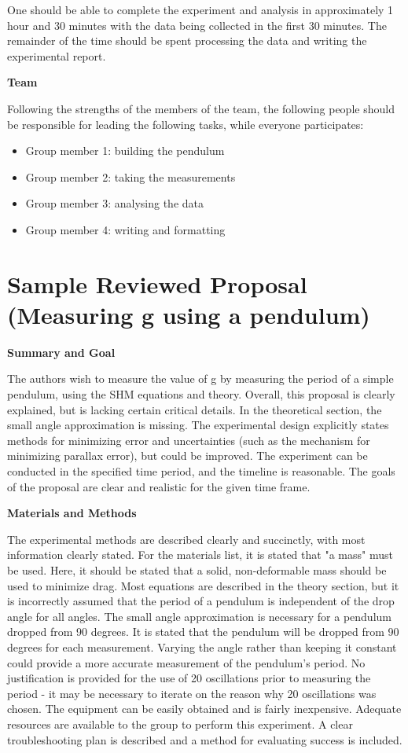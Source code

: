One should be able to complete the experiment and analysis in approximately 1 hour and 30 minutes with the data being collected in the first 30 minutes. The remainder of the time should be spent processing the data and writing the experimental report. 

\textbf{Team}

Following the strengths of the members of the team, the following people should be responsible for leading the following tasks, while everyone participates:

\begin{itemize}
\item Group member 1: building the pendulum
\item Group member 2: taking the measurements
\item Group member 3: analysing the data
\item Group member 4: writing and formatting
\end{itemize}

 \vspace{0.25cm}
\section{Sample Reviewed Proposal (Measuring g using a pendulum)}
 \vspace{0.25cm}
\textbf{Summary and Goal}

The authors wish to measure the value of g by measuring the period of a simple pendulum, using the SHM equations and theory. Overall, this proposal is clearly explained, but is lacking certain critical details. In the theoretical section, the small angle approximation is missing. The experimental design explicitly states methods for minimizing error and uncertainties (such as the mechanism for minimizing parallax error), but could be improved. The experiment can be conducted in the specified time period, and the timeline is reasonable. The goals of the proposal are clear and realistic for the given time frame. 

\textbf{Materials and Methods}

The experimental methods are described clearly and succinctly, with most information clearly stated. For the materials list, it is stated that "a mass" must be used. Here, it should be stated that a solid, non-deformable mass should be used to minimize drag. Most equations are described in the theory section, but it is incorrectly assumed that the period of a pendulum is independent of the drop angle for all angles. The small angle approximation is necessary for a pendulum dropped from 90 degrees. It is stated that the pendulum will be dropped from 90 degrees for each measurement. Varying the angle rather than keeping it constant could provide a more accurate measurement of the pendulum's period. No justification is provided for the use of 20 oscillations prior to measuring the period - it may be necessary to iterate on the reason why 20 oscillations was chosen. The equipment can be easily obtained and is fairly inexpensive. Adequate resources are available to the group to perform this experiment. A clear troubleshooting plan is described and a method for evaluating success is included. 

